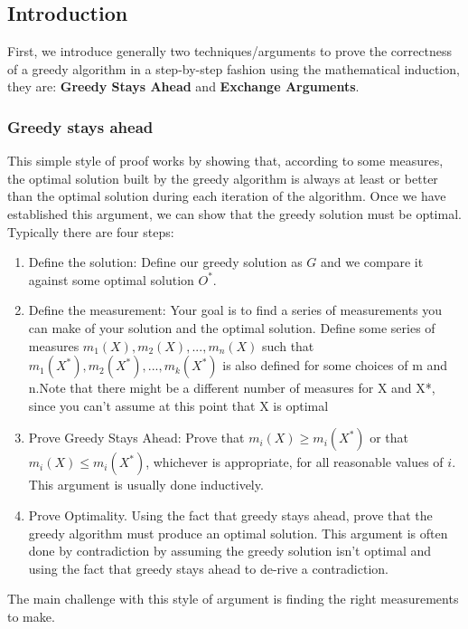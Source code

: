 \documentclass[../main.tex]{subfiles}
\begin{document}
\subsection{Introduction}
First, we introduce generally two techniques/arguments to prove the correctness of a greedy algorithm in a step-by-step fashion using the mathematical induction, they are: \textbf{Greedy Stays Ahead} and \textbf{Exchange Arguments}.
\subsubsection{Greedy stays ahead}
This simple style of proof works by showing that, according to some measures, the optimal solution built by the greedy algorithm is always at least or better than the optimal solution during each iteration of the algorithm. Once we have established this argument, we can show that the greedy solution must be optimal. Typically there are four steps:
    \begin{enumerate}
        \item Define the solution: Define our greedy solution as $G$ and we compare it against some optimal solution $O^{*}$.
        \item Define the measurement: Your goal is to find a series of measurements you can make of your solution and the optimal solution.  Define some series of measures $m_1(X), m_2(X), ..., m_n(X)$ such that $m_1(X^{*}), m_2(X^{*}), ..., m_k(X^{*})$ is also defined for some choices of m and n.Note that there might be a different number of measures for X and X*, since you can't assume at this point that X is optimal
        \item Prove Greedy Stays Ahead: Prove that $m_i(X)\geq m_i(X^{*})$ or that  $m_i(X)\leq m_i(X^{*})$, whichever is appropriate, for all reasonable values of $i$. This argument is usually done inductively.
        \item Prove Optimality.  Using the fact that greedy stays ahead, prove that the greedy algorithm must produce an optimal solution.  This argument is often done by contradiction by assuming the greedy solution isn't optimal and using the fact that greedy stays ahead to de-rive a contradiction.
    \end{enumerate}
    The main challenge with this style of argument is finding the right measurements to make. 
\end{document}

